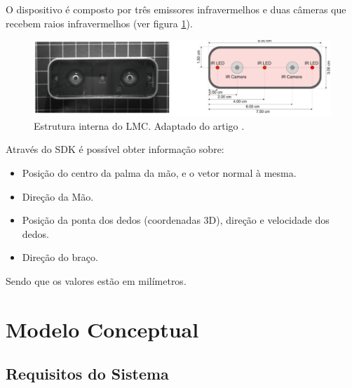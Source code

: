 \documentclass{TTUPhD}
\begin{document}
O dispositivo é composto por três emissores infravermelhos e duas câmeras que recebem raios infravermelhos (ver figura \ref{fig:lmc}).

\begin{figure}[h!]
    \center
    \includegraphics[scale=0.4]{./img/lmc.png}
    \caption{Estrutura interna do LMC. Adaptado do artigo \cite{linshao}.}
    \label{fig:lmc}
\end{figure}

\newpage

Através do SDK é possível obter informação sobre:

\begin{itemize}
    \item Posição do centro da palma da mão, e o vetor normal à mesma.
    \item Direção da Mão.
    \item Posição da ponta dos dedos (coordenadas 3D), direção e velocidade dos dedos.
    \item Direção do braço.
\end{itemize}

Sendo que os valores estão em milímetros.

%
%
%

\section{Modelo Conceptual}

\subsection{Requisitos do Sistema}
\end{document}
